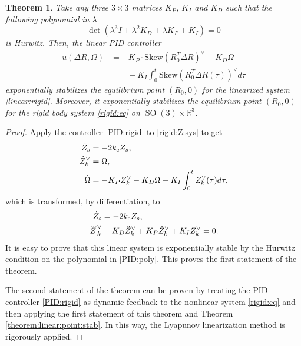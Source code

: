 \documentclass[letterpaper, 10 pt, conference]{ieeeconf}  %
\newtheorem{theorem}{Theorem}[section]
\newcommand{\Skew}{\mathrm{Skew}}
\newcommand{\SO}{\operatorname{SO}(3)}
\newcommand{\coV}{{k_{\rm e}}}
\begin{document}
\begin{theorem}\label{theorem:PID:point:stab}
Take any three $3\times 3$ matrices $K_P$, $K_I$ and $K_D$ such that the following  polynomial in $\lambda$
\begin{equation}\label{PID:poly}
\det (\lambda^3 I + \lambda^2K_D + \lambda K_P + K_I) = 0
\end{equation}
is Hurwitz. Then, the linear PID  controller
\begin{align}
u(\Delta R,\Omega) &= -K_P  \cdot \Skew (R_0^T\Delta R)^\vee   - K_D\Omega \nonumber \\
&\quad\quad - K_I \int_0^t  \Skew (R_0^T\Delta R(\tau))^\vee  d\tau \label{PID:rigid}
\end{align}
 exponentially stabilizes the equilibrium point $(R_0,0)$ for the linearized system  \eqref{linear:rigid}. Moreover, it exponentially stabilizes the equilibrium point $(R_0,0)$ for the rigid body system \eqref{rigid:eq} on $\SO \times \mathbb R^3$.
\end{theorem}
\begin{proof}
Apply the controller  \eqref{PID:rigid} to  \eqref{rigid:Z:sys}  to get
\begin{align*}
\dot Z_s &= -2\coV Z_s,\\
\dot Z_k^\vee &=  \Omega, \\
\dot \Omega  &=  - K_PZ_k^\vee - K_D\Omega - K_I\int_0^tZ_k^\vee(\tau) d\tau,
\end{align*}
which is transformed, by differentiation, to
\begin{align*}
\dot Z_s &= -2\coV Z_s,\\
\dddot Z_k^\vee &+ K_D \ddot Z_k^\vee + K_P\dot Z_k^\vee + K_I  Z_k^\vee = 0.
\end{align*}
It is easy to prove that this linear system is exponentially stable by the Hurwitz condition on the polynomial in \eqref{PID:poly}.
This proves the first statement of the theorem. 

The second statement of the theorem can be proven by treating the PID controller \eqref{PID:rigid} as dynamic feedback to the nonlinear system \eqref{rigid:eq}  and then applying  the first statement of this theorem and Theorem \ref{theorem:linear:point:stab}. In this way, the Lyapunov linearization method is rigorously applied.  
\end{proof}
\end{document}
